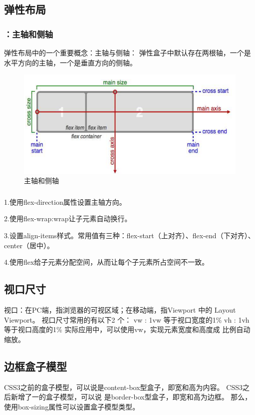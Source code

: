 \subsection{弹性布局}
\subsubsection*{：主轴和侧轴}
弹性布局中的一个重要概念：主轴与侧轴： 弹性盒子中默认存在两根轴，一个是水平方向的主轴，一个是垂直方向的侧轴。
\begin{figure}[H]
    \centering
    \includegraphics[scale=0.7]{figures/2.2.9.png}
    \caption{主轴和侧轴}
\end{figure}

\subsubsection*{}
1.使用flex-direction属性设置主轴方向。

2.使用flex-wrap:wrap让子元素自动换行。

3.设置align-items样式。常用值有三种：flex-start（上对齐）、flex-end（下对齐）、center（居中）。

4.使用flex给子元素分配空间，从而让每个子元素所占空间不一致。

\subsection{视口尺寸}
视口：在PC端，指浏览器的可视区域；在移动端，指Viewport 中的 Layout Viewport。 视口尺寸常用的有以下2
个： vw : 1vw 等于视口宽度的1\% vh : 1vh 等于视口高度的1\% 实际应用中，可以使用vw，实现元素宽度和高度成
比例自动缩放。

\subsection{边框盒子模型}
CSS3之前的盒子模型，可以说是content-box型盒子，即宽和高为内容。 CSS3之后新增了一的盒子模型，可以说
是border-box型盒子，即宽和高为边框。 那么，使用box-sizing属性可以设置盒子模型类型。